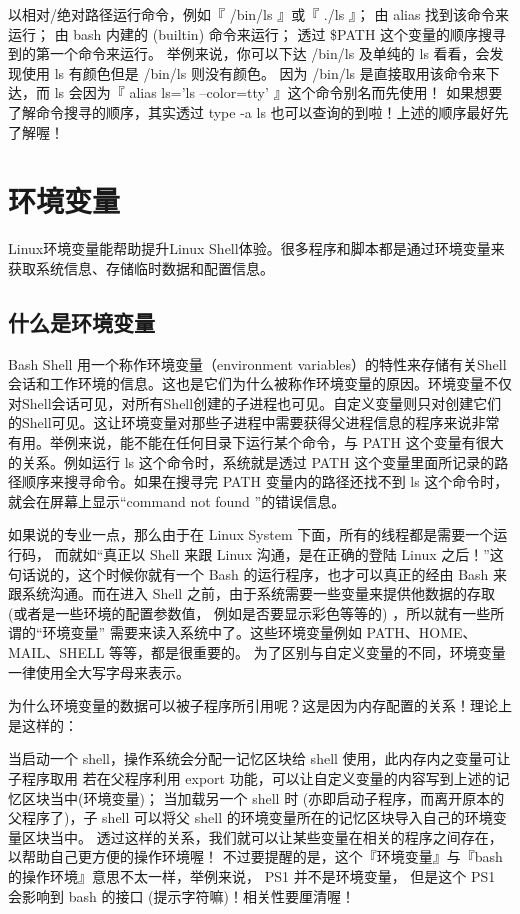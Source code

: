 以相对/绝对路径运行命令，例如『 /bin/ls 』或『 ./ls 』；
由 alias 找到该命令来运行；
由 bash 内建的 (builtin) 命令来运行；
透过 \$PATH 这个变量的顺序搜寻到的第一个命令来运行。
举例来说，你可以下达 /bin/ls 及单纯的 ls 看看，会发现使用 ls 有颜色但是 /bin/ls 则没有颜色。 因为 /bin/ls 是直接取用该命令来下达，而 ls 会因为『 alias ls='ls --color=tty' 』这个命令别名而先使用！ 如果想要了解命令搜寻的顺序，其实透过 type -a ls 也可以查询的到啦！上述的顺序最好先了解喔！




\section{环境变量}
Linux环境变量能帮助提升Linux Shell体验。很多程序和脚本都是通过环境变量来获取系统信息、存储临时数据和配置信息。

\subsection{什么是环境变量}
Bash Shell 用一个称作环境变量（environment variables）的特性来存储有关Shell会话和工作环境的信息。这也是它们为什么被称作环境变量的原因。环境变量不仅对Shell会话可见，对所有Shell创建的子进程也可见。自定义变量则只对创建它们的Shell可见。这让环境变量对那些子进程中需要获得父进程信息的程序来说非常有用。举例来说，能不能在任何目录下运行某个命令，与 PATH 这个变量有很大的关系。例如运行 ls 这个命令时，系统就是透过 PATH 这个变量里面所记录的路径顺序来搜寻命令。如果在搜寻完 PATH 变量内的路径还找不到 ls 这个命令时， 就会在屏幕上显示“command not found ”的错误信息。

如果说的专业一点，那么由于在 Linux System 下面，所有的线程都是需要一个运行码， 而就如“真正以 Shell 来跟 Linux 沟通，是在正确的登陆 Linux 之后！”这句话说的，这个时候你就有一个 Bash 的运行程序，也才可以真正的经由 Bash 来跟系统沟通。而在进入 Shell 之前，由于系统需要一些变量来提供他数据的存取 (或者是一些环境的配置参数值， 例如是否要显示彩色等等的) ，所以就有一些所谓的“环境变量” 需要来读入系统中了。这些环境变量例如 PATH、HOME、MAIL、SHELL 等等，都是很重要的。 为了区别与自定义变量的不同，环境变量一律使用全大写字母来表示。


为什么环境变量的数据可以被子程序所引用呢？这是因为内存配置的关系！理论上是这样的：

当启动一个 shell，操作系统会分配一记忆区块给 shell 使用，此内存内之变量可让子程序取用
若在父程序利用 export 功能，可以让自定义变量的内容写到上述的记忆区块当中(环境变量)；
当加载另一个 shell 时 (亦即启动子程序，而离开原本的父程序了)，子 shell 可以将父 shell 的环境变量所在的记忆区块导入自己的环境变量区块当中。
透过这样的关系，我们就可以让某些变量在相关的程序之间存在，以帮助自己更方便的操作环境喔！ 不过要提醒的是，这个『环境变量』与『bash 的操作环境』意思不太一样，举例来说， PS1 并不是环境变量， 但是这个 PS1 会影响到 bash 的接口 (提示字符嘛)！相关性要厘清喔！

